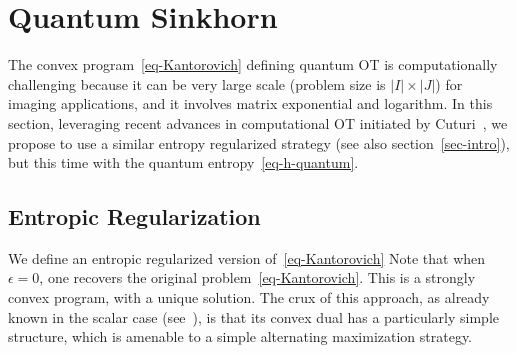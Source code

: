 
\section{Quantum Sinkhorn}
\label{eq-q-sink}

The convex program~\eqref{eq-Kantorovich} defining quantum OT is computationally challenging because it can be very large scale (problem size is $|I| \times |J|$) for imaging applications, and it involves matrix exponential and logarithm. In this section, leveraging recent advances in computational OT initiated by Cuturi~, we propose to use a similar entropy regularized strategy (see also section~\ref{sec-intro}), but this time with the quantum entropy~\eqref{eq-h-quantum}. 

\subsection{Entropic Regularization}

We define an entropic regularized version of~\eqref{eq-Kantorovich}
Note that when $\epsilon=0$, one recovers the original problem~\eqref{eq-Kantorovich}. 
%
This is a strongly convex program, with a unique solution. The crux of this approach, as already known in the scalar case (see~\cite{2016-chizat-sinkhorn}), is that its convex dual has a particularly simple structure, which is amenable to a simple alternating maximization strategy. 

